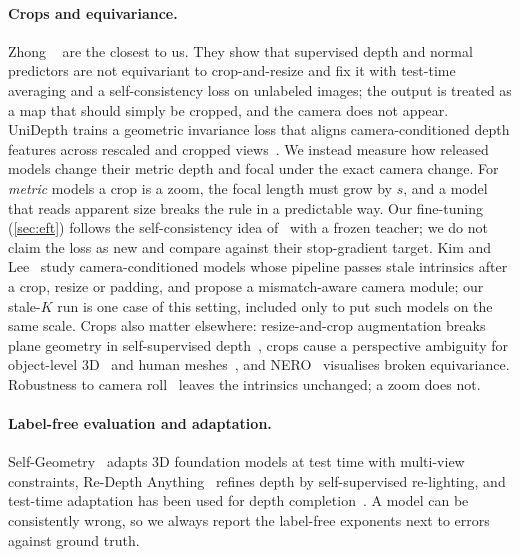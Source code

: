 \paragraph{Crops and equivariance.}
Zhong \etal~\cite{zhong2023equivariance} are the closest to us. They show that supervised depth and normal
predictors are not equivariant to crop-and-resize and fix it with test-time averaging and a self-consistency
loss on unlabeled images; the output is treated as a map that should simply be cropped, and the camera does
not appear. UniDepth trains a geometric invariance loss that aligns camera-conditioned depth features across
rescaled and cropped views~\cite{piccinelli2024unidepth}. We instead measure how released models change their
metric depth and focal under the exact camera change. For \emph{metric} models a crop is a zoom, the focal length must
grow by $s$, and a model that reads apparent size breaks the rule in a predictable way. Our fine-tuning
(\cref{sec:eft}) follows the self-consistency idea of~\cite{zhong2023equivariance} with a frozen teacher; we do
not claim the loss as new and compare against their stop-gradient target.
Kim and Lee~\cite{kim2026mismatch} study camera-conditioned models whose pipeline passes stale intrinsics after a
crop, resize or padding, and propose a mismatch-aware camera module; our stale-$K$ run is one case of this
setting, included only to put such models on the same scale.
Crops also matter elsewhere: resize-and-crop augmentation breaks plane geometry in self-supervised
depth~\cite{wang2023planedepth}, crops cause a perspective ambiguity for object-level 3D~\cite{prakash2024kpe} and
human meshes~\cite{nie2024multicrop}, and NERO~\cite{zhao2023nero} visualises broken equivariance. Robustness to
camera roll~\cite{tang2026roll} leaves the intrinsics unchanged; a zoom does not.

\paragraph{Label-free evaluation and adaptation.}
Self-Geometry~\cite{youn2026selfgeometry} adapts 3D foundation models at test time with multi-view
constraints, Re-Depth Anything~\cite{bhattarai2025redepth} refines depth by self-supervised re-lighting, and
test-time adaptation has been used for depth completion~\cite{park2024ttadepth}. A model can be consistently wrong, so we always report the
label-free exponents next to errors against ground truth.
